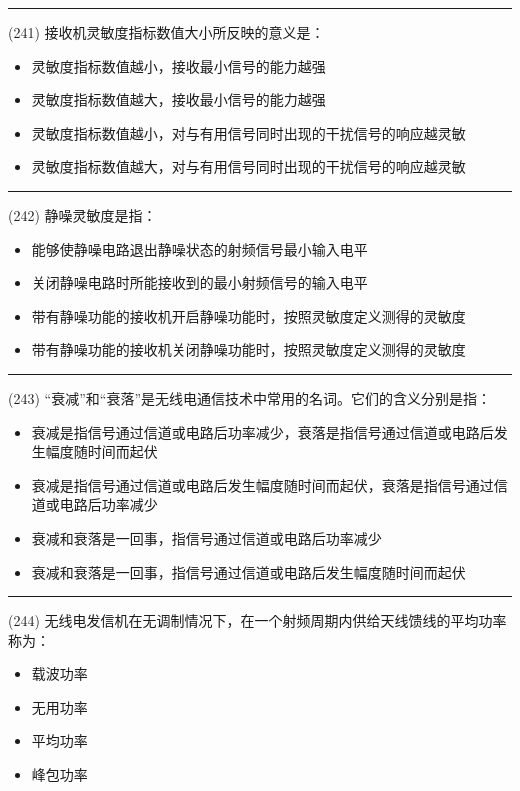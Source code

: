 \documentclass[twocolumn]{ctexart}  %
\begin{document}
\noindent\rule{0.5\textwidth}{1pt}
\heiti (241) 接收机灵敏度指标数值大小所反映的意义是： \songti {\color{gray} [LK0816] }
\begin{itemize}
	\item  灵敏度指标数值越小，接收最小信号的能力越强
	\item  灵敏度指标数值越大，接收最小信号的能力越强
	\item  灵敏度指标数值越小，对与有用信号同时出现的干扰信号的响应越灵敏
	\item  灵敏度指标数值越大，对与有用信号同时出现的干扰信号的响应越灵敏
\end{itemize}


\noindent\rule{0.5\textwidth}{1pt}
\heiti (242) 静噪灵敏度是指： \songti {\color{gray} [LK0819] }
\begin{itemize}
	\item  能够使静噪电路退出静噪状态的射频信号最小输入电平
	\item  关闭静噪电路时所能接收到的最小射频信号的输入电平
	\item  带有静噪功能的接收机开启静噪功能时，按照灵敏度定义测得的灵敏度
	\item  带有静噪功能的接收机关闭静噪功能时，按照灵敏度定义测得的灵敏度
\end{itemize}


\noindent\rule{0.5\textwidth}{1pt}
\heiti (243) “衰减”和“衰落”是无线电通信技术中常用的名词。它们的含义分别是指： \songti {\color{gray} [LK0854] }
\begin{itemize}
	\item  衰减是指信号通过信道或电路后功率减少，衰落是指信号通过信道或电路后发生幅度随时间而起伏
	\item  衰减是指信号通过信道或电路后发生幅度随时间而起伏，衰落是指信号通过信道或电路后功率减少
	\item  衰减和衰落是一回事，指信号通过信道或电路后功率减少
	\item  衰减和衰落是一回事，指信号通过信道或电路后发生幅度随时间而起伏
\end{itemize}


\noindent\rule{0.5\textwidth}{1pt}
\heiti (244) 无线电发信机在无调制情况下，在一个射频周期内供给天线馈线的平均功率称为： \songti {\color{gray} [LK1044] }
\begin{itemize}
	\item  载波功率
	\item  无用功率
	\item  平均功率
	\item  峰包功率
\end{itemize}
\end{document}
